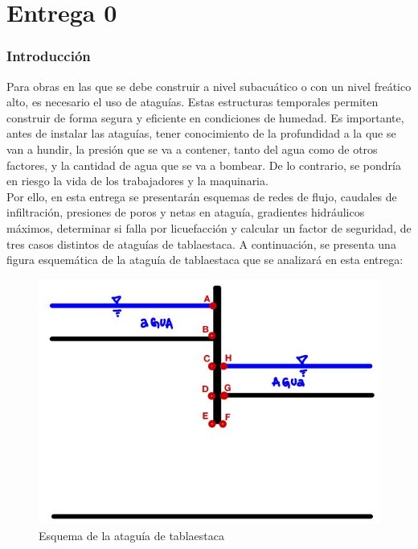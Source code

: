 \documentclass{article}
\begin{document}
\part{Entrega 0}
\section{Introducción}
Para obras en las que se debe construir a nivel subacuático o con un nivel freático alto, es necesario el uso de ataguías. Estas estructuras temporales permiten construir de forma segura y eficiente en condiciones de humedad. Es importante, antes de instalar las ataguías, tener conocimiento de la profundidad a la que se van a hundir, la presión que se va a contener, tanto del agua como de otros factores, y la cantidad de agua que se va a bombear. De lo contrario, se pondría en riesgo la vida de los trabajadores y la maquinaria. \\

Por ello, en esta entrega se presentarán esquemas de redes de flujo, caudales de infiltración, presiones de poros y netas en ataguía, gradientes hidráulicos máximos, determinar si falla por licuefacción y calcular un factor de seguridad, de tres casos distintos de ataguías de tablaestaca. A continuación, se presenta una figura esquemática de la ataguía de tablaestaca que se analizará en esta entrega:

\begin{figure}[h!]
  \centering
  \includegraphics[width=0.8\linewidth]{graficos/puntos_interes.png}
  \caption{Esquema de la ataguía de tablaestaca}
  \label{fig:enunciado}
\end{figure}

\newpage
\end{document}
